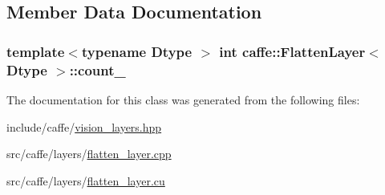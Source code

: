 \subsection{Member Data Documentation}
\hypertarget{classcaffe_1_1_flatten_layer_ac162173144262f64a0450799072d4090}{
\subsubsection[{count\+\_\+}]{\setlength{\rightskip}{0pt plus 5cm}template$<$typename Dtype $>$ int {\bf caffe\+::\+Flatten\+Layer}$<$ Dtype $>$\+::count\+\_\+\hspace{0.3cm}{\ttfamily [protected]}}}\label{classcaffe_1_1_flatten_layer_ac162173144262f64a0450799072d4090}


The documentation for this class was generated from the following files\+:\begin{DoxyCompactItemize}
\item 
include/caffe/\hyperlink{vision__layers_8hpp}{vision\+\_\+layers.\+hpp}\item 
src/caffe/layers/\hyperlink{flatten__layer_8cpp}{flatten\+\_\+layer.\+cpp}\item 
src/caffe/layers/\hyperlink{flatten__layer_8cu}{flatten\+\_\+layer.\+cu}\end{DoxyCompactItemize}
